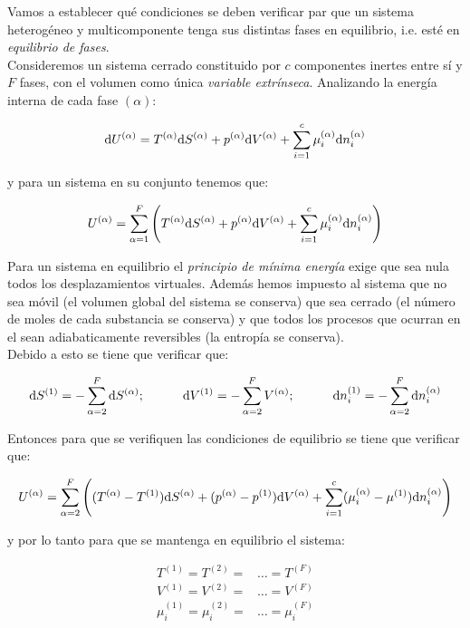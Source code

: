 \documentclass[12pt,a4paper,oneside]{book}
\begin{document}
Vamos a establecer qué condiciones se deben verificar par que un sistema heterogéneo y multicomponente tenga sus distintas fases en equilibrio, i.e. esté en \textit{equilibrio de fases}. \\

Consideremos un sistema cerrado constituido por $c$ componentes inertes entre sí y $F$ fases, con el volumen como única \textit{variable extrínseca}. Analizando la energía interna de cada fase $(\alpha)$:

$$ \mathrm{d} U^{(\alpha)} = T^{(\alpha)} \mathrm{d} S^{(\alpha)} + p^{(\alpha)} \mathrm{d} V^{(\alpha)} + \sum_{i=1}^c \mu_i^{(\alpha)} \mathrm{d} n_i^{(\alpha)} $$

y para un sistema en su conjunto tenemos que:

$$  U^{(\alpha)} = \sum_{\alpha=1}^F  \left( T^{(\alpha)} \mathrm{d} S^{(\alpha)} + p^{(\alpha)} \mathrm{d} V^{(\alpha)} + \sum_{i=1}^c \mu_i^{(\alpha)} \mathrm{d} n_i^{(\alpha)} \right) $$

Para un sistema en equilibrio el \textit{principio de mínima energía} exige que sea nula todos los desplazamientos virtuales. Además hemos impuesto al sistema que no sea móvil (el volumen global del sistema se conserva) que sea cerrado (el número de moles de cada substancia se conserva) y que todos los procesos que ocurran en el sean adiabaticamente reversibles (la entropía se conserva).\\

Debido a esto se tiene que verificar que:

\begin{equation}
\mathrm{d} S^{(1)}= - \sum_{\alpha=2}^F \mathrm{d} S^{(\alpha)}; \quad \quad \quad \mathrm{d} V^{(1)} = - \sum_{\alpha=2}^F V^{(\alpha)}; \quad \quad \quad \mathrm{d} n_i^{(1)} =- \sum_{\alpha=2}^F \mathrm{d} n_i^{(\alpha)}
\end{equation}


Entonces para que se verifiquen las condiciones de equilibrio se tiene que verificar que:

$$  U^{(\alpha)} = \sum_{\alpha=2}^F  \left( (T^{(\alpha)}-T^{(1)}) \mathrm{d} S^{(\alpha)} + (p^{(\alpha)}-p^{(1)}) \mathrm{d} V^{(\alpha)} + \sum_{i=1}^c (\mu_i^{(\alpha)}-\mu^{(1)}) \mathrm{d} n_i^{(\alpha)} \right) $$

y por lo tanto para que se mantenga en equilibrio el sistema:

\begin{equation}
\begin{array}{ll}
T^{(1)} = T^{(2)} = & \ldots = T^{(F)} \\
V^{(1)} = V^{(2)} = & \ldots = V^{(F)} \\
\mu_i^{(1)} = \mu_i^{(2)} = & \ldots = \mu_i^{(F)} \\
\end{array}
\end{equation}
\end{document}
